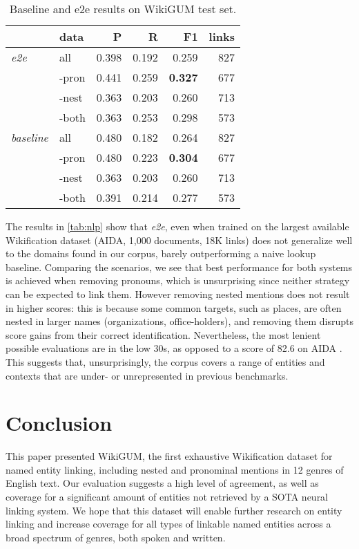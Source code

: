 \documentclass[11pt,a4paper]{article}
\begin{document}
\begin{table}[h!bt]
\normalsize
\begin{tabular}{llrrrr}
\hline
 & data & P & R & F1 & links \\
\hline
\textit{e2e} & all & 0.398 & 0.192 & 0.259 & 827  \\
 & -pron & 0.441 & 0.259 & \textbf{0.327} & 677  \\
 & -nest & 0.363 & 0.203 & 0.260 & 713  \\
 & -both & 0.363 & 0.253 & 0.298 & 573  \\
 \hline
\textit{baseline} & all & 0.480 & 0.182 & 0.264 & 827  \\
 & -pron & 0.480 & 0.223 & \textbf{0.304} & 677 \\
 & -nest & 0.363 & 0.203 & 0.260 & 713 \\ 
 & -both & 0.391 & 0.214 & 0.277 & 573
\\ \hline 
\end{tabular}
 \caption{Baseline and e2e results on WikiGUM test set.}
\end{table}\label{tab:nlp}

The results in \ref{tab:nlp} show that \textit{e2e}, even when trained on the largest available Wikification dataset (AIDA, 1,000 documents, 18K links) does not generalize well to the domains found in our corpus, barely outperforming a naive lookup baseline. Comparing the scenarios, we see that best performance for both systems is achieved when removing pronouns, which is unsurprising since neither strategy can be expected to link them. However removing nested mentions does not result in higher scores: this is because some common targets, such as places, are often nested in larger names (organizations, office-holders), and removing them disrupts score gains from their correct identification. Nevertheless, the most lenient possible evaluations are in the low 30s, as opposed to a score of 82.6 on AIDA \cite[524]{kolitsas-etal-2018-end}. This suggests that, unsurprisingly, the corpus covers a range of entities and contexts that are under- or unrepresented in previous benchmarks.

\section{Conclusion}

This paper presented WikiGUM, the first exhaustive Wikification dataset for named entity linking, including nested and pronominal mentions in 12 genres of English text. Our evaluation suggests a high level of agreement, as well as coverage for a significant amount of entities not retrieved by a SOTA neural linking system. We hope that this dataset will enable further research on entity linking and increase coverage for all types of linkable named entities across a broad spectrum of genres, both spoken and written.



\end{document}
